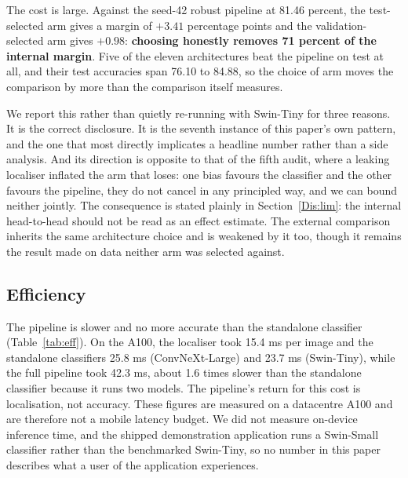 \documentclass{melba}
\begin{document}
The cost is large. Against the seed-42 robust pipeline at 81.46 percent, the test-selected arm gives a margin of $+3.41$ percentage points and the validation-selected arm gives $+0.98$: \textbf{choosing honestly removes 71 percent of the internal margin}. Five of the eleven architectures beat the pipeline on test at all, and their test accuracies span 76.10 to 84.88, so the choice of arm moves the comparison by more than the comparison itself measures.

We report this rather than quietly re-running with Swin-Tiny for three reasons. It is the correct disclosure. It is the seventh instance of this paper's own pattern, and the one that most directly implicates a headline number rather than a side analysis. And its direction is opposite to that of the fifth audit, where a leaking localiser inflated the arm that loses: one bias favours the classifier and the other favours the pipeline, they do not cancel in any principled way, and we can bound neither jointly. The consequence is stated plainly in Section~\ref{Dis:lim}: the internal head-to-head should not be read as an effect estimate. The external comparison inherits the same architecture choice and is weakened by it too, though it remains the result made on data neither arm was selected against.

\subsection{Efficiency}
\label{Res:eff}
The pipeline is slower and no more accurate than the standalone classifier (Table~\ref{tab:eff}). On the A100, the localiser took 15.4 ms per image and the standalone classifiers 25.8 ms (ConvNeXt-Large) and 23.7 ms (Swin-Tiny), while the full pipeline took 42.3 ms, about 1.6 times slower than the standalone classifier because it runs two models. The pipeline's return for this cost is localisation, not accuracy. These figures are measured on a datacentre A100 and are therefore not a mobile latency budget. We did not measure on-device inference time, and the shipped demonstration application runs a Swin-Small classifier rather than the benchmarked Swin-Tiny, so no number in this paper describes what a user of the application experiences.
\end{document}
